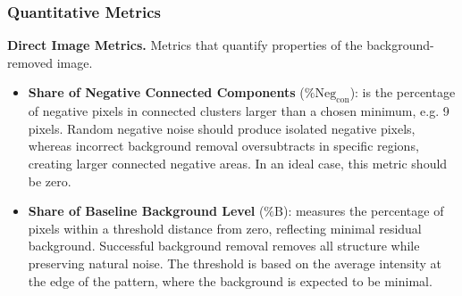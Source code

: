 \documentclass[iucr,review]{iucrjournals}
\begin{document}
\subsubsection{Quantitative Metrics}
\textbf{Direct Image Metrics.} Metrics that quantify properties of the background-removed image.
\begin{itemize}
        \item \textbf{Share of Negative Connected Components} ($\%\mathrm{Neg}_{\mathrm{con}}$): is the  percentage of negative pixels in 
        connected clusters larger than a chosen minimum, e.g. 9 pixels. 
        Random negative noise should produce isolated negative pixels,
        whereas incorrect background removal oversubtracts in specific regions,
        creating larger connected negative areas. In an ideal case,
        this metric should be zero.
        \item \textbf{Share of Baseline Background Level} ($\%\mathrm{B}$):
        measures the percentage of pixels within a threshold
        distance from zero, reflecting minimal residual background.
        Successful background removal removes all structure while preserving natural noise.
        The threshold is based on the average intensity at the edge of the pattern, 
        where the background is expected to be minimal.




\end{itemize}
\end{document}
